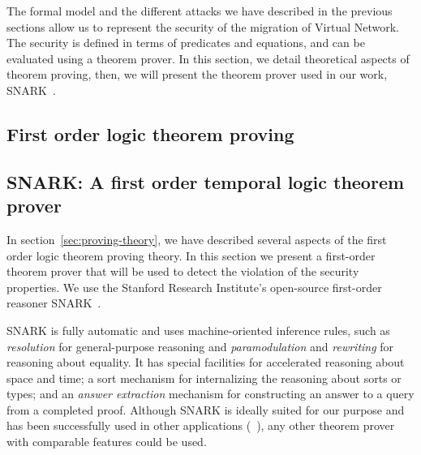 The formal model and the different attacks we have described in the previous sections allow us to represent the security of the migration of Virtual Network. The security is defined in terms of predicates and equations, and can be evaluated using a theorem prover.
In this section, we detail theoretical aspects of theorem proving, then, we will present the theorem prover used in our work, SNARK~\cite{snark-Stickel2000}.

\subsection{First order logic theorem proving}



\subsection{SNARK: A first order temporal logic theorem prover}
\label{sec:proof-detects-violation}
In section~\ref{sec:proving-theory}, we have described several aspects of the first order logic theorem proving theory.
In this section we  present a first-order theorem prover that will be used to detect the violation of the security properties.
We use the Stanford Research Institute's open-source first-order reasoner SNARK~\cite{snark-Stickel2000}.

SNARK is fully automatic and uses machine-oriented inference rules, such as \textit{resolution} for general-purpose reasoning and \textit{paramodulation} and \textit{rewriting} for reasoning about equality.
It has special facilities
for accelerated reasoning about space and time; a sort mechanism for internalizing the reasoning about sorts or types; and an \textit{answer extraction} mechanism for constructing an answer to a query from a completed proof. 
Although SNARK is ideally suited for our purpose and has been successfully used in other applications (\eg~\cite{AICPub2006:2015}), any other theorem prover with comparable features could be used.


